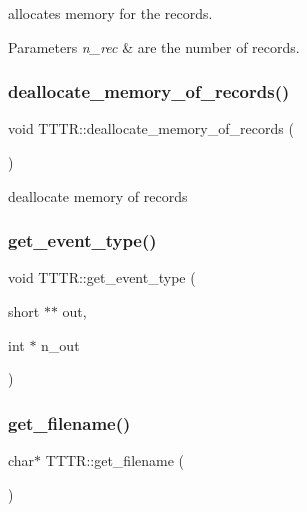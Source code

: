 allocates memory for the records. 


\begin{DoxyParams}{Parameters}
{\em n\+\_\+rec} & are the number of records. \\
\hline
\end{DoxyParams}
\mbox{\label{class_t_t_t_r_af80300e1fdd7ba618dbb33853c832a22}} 
\subsubsection{\texorpdfstring{deallocate\+\_\+memory\+\_\+of\+\_\+records()}{deallocate\_memory\_of\_records()}}
{\footnotesize\ttfamily void T\+T\+T\+R\+::deallocate\+\_\+memory\+\_\+of\+\_\+records (\begin{DoxyParamCaption}{ }\end{DoxyParamCaption})\hspace{0.3cm}{\ttfamily [protected]}}



deallocate memory of records 

\mbox{\label{class_t_t_t_r_a449e92c3f30e013991cfdd1449aea609}} 
\subsubsection{\texorpdfstring{get\+\_\+event\+\_\+type()}{get\_event\_type()}}
{\footnotesize\ttfamily void T\+T\+T\+R\+::get\+\_\+event\+\_\+type (\begin{DoxyParamCaption}\item[{short $\ast$$\ast$}]{out,  }\item[{int $\ast$}]{n\+\_\+out }\end{DoxyParamCaption})}

\mbox{\label{class_t_t_t_r_a3d856d880c72ad9772de2a774066cced}} 
\subsubsection{\texorpdfstring{get\+\_\+filename()}{get\_filename()}}
{\footnotesize\ttfamily char$\ast$ T\+T\+T\+R\+::get\+\_\+filename (\begin{DoxyParamCaption}{ }\end{DoxyParamCaption})}

